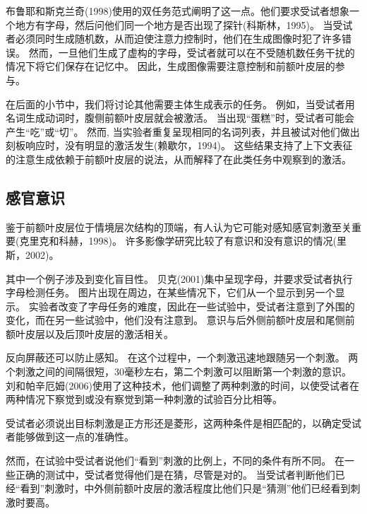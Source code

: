 布鲁耶和斯克兰奇(1998)使用的双任务范式阐明了这一点。他们要求受试者想象一个地方有字母，然后问他们同一个地方是否出现了探针(科斯林，1995)。
当受试者必须同时生成随机数，从而迫使注意力控制时，他们在生成图像时犯了许多错误。
然而，一旦他们生成了虚构的字母，受试者就可以在不受随机数任务干扰的情况下将它们保存在记忆中。
因此，生成图像需要注意控制和前额叶皮层的参与。
\par


在后面的小节中，我们将讨论其他需要主体生成表示的任务。
例如，当受试者用名词生成动词时，腹侧前额叶皮层就会被激活。
当出现“蛋糕”时，受试者可能会产生“吃”或“切”。
然而, 当实验者重复呈现相同的名词列表，并且被试对他们做出刻板响应时，没有明显的激活发生(赖歇尔，1994)。
这些结果支持了上下文表征的注意生成依赖于前额叶皮层的说法，从而解释了在此类任务中观察到的激活。



\subsection{感官意识}

鉴于前额叶皮层位于情境层次结构的顶端，有人认为它可能对感知感官刺激至关重要(克里克和科赫，1998)。
许多影像学研究比较了有意识和没有意识的情况(里斯，2002)。
\par


其中一个例子涉及到变化盲目性。
贝克(2001)集中呈现字母，并要求受试者执行字母检测任务。
图片出现在周边，在某些情况下，它们从一个显示到另一个显示。
实验者改变了字母任务的难度，因此在一些试验中，受试者注意到了外围的变化，而在另一些试验中，他们没有注意到。
意识与后外侧前额叶皮层和尾侧前额叶皮层以及后顶叶皮层的激活相关。
\par


反向屏蔽还可以防止感知。
在这个过程中，一个刺激迅速地跟随另一个刺激。
两个刺激之间的间隔很短，30毫秒左右，第二个刺激可以阻断第一个刺激的意识。
刘和帕辛厄姆(2006)使用了这种技术，他们调整了两种刺激的时间，以使受试者在两种情况下察觉到或没有察觉到第一种刺激的试验百分比相等。
\par


受试者必须说出目标刺激是正方形还是菱形，这两种条件是相匹配的，以确定受试者能够做到这一点的准确性。
\par


然而，在试验中受试者说他们“看到”刺激的比例上，不同的条件有所不同。
在一些正确的测试中，受试者觉得他们是在猜，尽管是对的。
当受试者判断他们已经“看到”刺激时，中外侧前额叶皮层的激活程度比他们只是“猜测”他们已经看到刺激时要高。
\par


